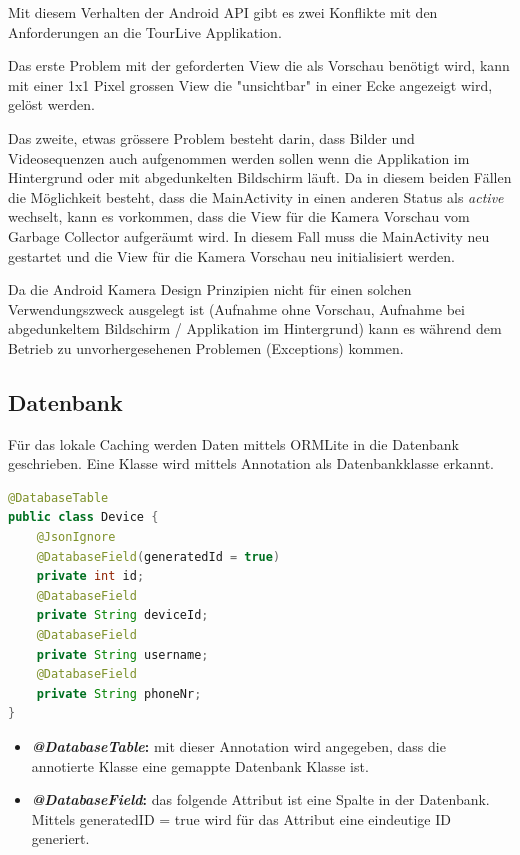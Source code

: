 Mit diesem Verhalten der Android API gibt es zwei Konflikte mit den Anforderungen an die TourLive Applikation. 

Das erste Problem mit der geforderten View die als Vorschau benötigt wird,  kann mit einer 1x1 Pixel grossen View die "unsichtbar" in einer Ecke angezeigt wird, gelöst werden. 

Das zweite, etwas grössere Problem besteht darin, dass Bilder und Videosequenzen auch aufgenommen werden sollen wenn die Applikation im Hintergrund oder mit abgedunkelten Bildschirm läuft. Da in diesem beiden Fällen die Möglichkeit besteht, dass die MainActivity in einen anderen Status als \textit{active} wechselt, kann es vorkommen, dass die View für die Kamera Vorschau vom Garbage Collector aufgeräumt wird. In diesem Fall muss die MainActivity neu gestartet und die View für die Kamera Vorschau neu initialisiert werden. 

Da die Android Kamera Design Prinzipien nicht für einen solchen Verwendungszweck ausgelegt ist (Aufnahme ohne Vorschau, Aufnahme bei abgedunkeltem Bildschirm / Applikation im Hintergrund) kann es während dem Betrieb zu unvorhergesehenen Problemen (Exceptions) kommen.

\subsection{Datenbank}
Für das lokale Caching werden Daten mittels ORMLite in die Datenbank geschrieben. Eine Klasse wird mittels Annotation als Datenbankklasse erkannt.

\begin{lstlisting}[language=Java, caption=ORMLite Annotations]
@DatabaseTable
public class Device {
	@JsonIgnore
	@DatabaseField(generatedId = true)
	private int id;
	@DatabaseField
	private String deviceId;
	@DatabaseField
	private String username;
	@DatabaseField
	private String phoneNr;
}
\end{lstlisting}

\begin{itemize}
\item \textbf{\textit{@DatabaseTable}:} mit dieser Annotation wird angegeben, dass die annotierte Klasse  eine gemappte Datenbank Klasse ist.
\item \textbf{\textit{@DatabaseField}:} das folgende Attribut ist eine Spalte in der Datenbank. Mittels generatedID = true wird für das Attribut eine eindeutige ID generiert.
\end{itemize}


